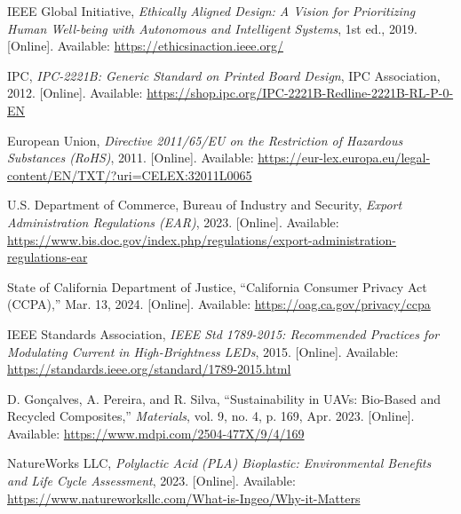 \documentclass[12pt]{article}
\begin{document}
\begin{thebibliography}{99}
IEEE Global Initiative, \emph{Ethically Aligned Design: A Vision for Prioritizing Human Well-being with Autonomous and Intelligent Systems}, 1st ed., 2019. [Online]. Available: \url{https://ethicsinaction.ieee.org/}

IPC, \emph{IPC-2221B: Generic Standard on Printed Board Design}, IPC Association, 2012. [Online]. Available: \url{https://shop.ipc.org/IPC-2221B-Redline-2221B-RL-P-0-EN}

European Union, \emph{Directive 2011/65/EU on the Restriction of Hazardous Substances (RoHS)}, 2011. [Online]. Available: \url{https://eur-lex.europa.eu/legal-content/EN/TXT/?uri=CELEX:32011L0065}

U.S. Department of Commerce, Bureau of Industry and Security, \emph{Export Administration Regulations (EAR)}, 2023. [Online]. Available: \url{https://www.bis.doc.gov/index.php/regulations/export-administration-regulations-ear}

State of California Department of Justice, “California Consumer Privacy Act (CCPA),” Mar. 13, 2024. [Online]. Available: \url{https://oag.ca.gov/privacy/ccpa}

IEEE Standards Association, \emph{IEEE Std 1789-2015: Recommended Practices for Modulating Current in High-Brightness LEDs}, 2015. [Online]. Available: \url{https://standards.ieee.org/standard/1789-2015.html}

D. Gonçalves, A. Pereira, and R. Silva, “Sustainability in UAVs: Bio-Based and Recycled Composites,” \emph{Materials}, vol. 9, no. 4, p. 169, Apr. 2023. [Online]. Available: \url{https://www.mdpi.com/2504-477X/9/4/169}

NatureWorks LLC, \emph{Polylactic Acid (PLA) Bioplastic: Environmental Benefits and Life Cycle Assessment}, 2023. [Online]. Available: \url{https://www.natureworksllc.com/What-is-Ingeo/Why-it-Matters}

\end{thebibliography}

\end{document}
